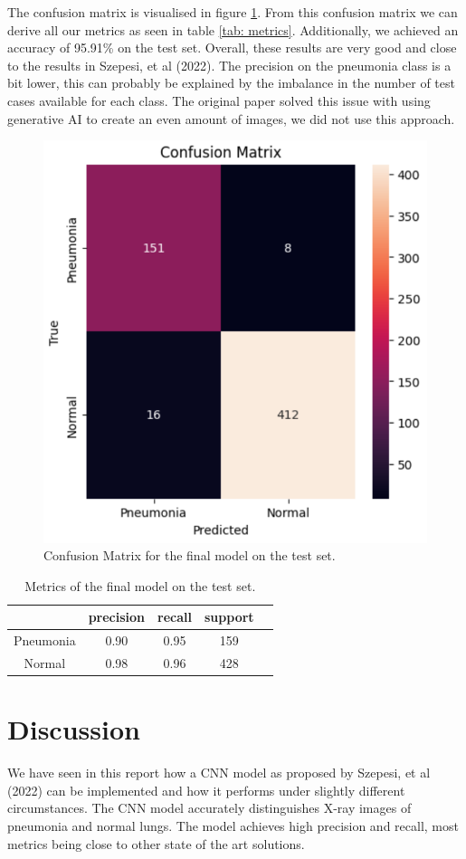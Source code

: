 \documentclass[a4paper]{article}
\begin{document}
The confusion matrix is visualised in figure \ref{fig: confusion matrix}. From
this confusion matrix we can derive all our metrics as seen in table \ref{tab:
metrics}. Additionally, we achieved an accuracy of 95.91\% on the test set.
Overall, these results are very good and close to the results in Szepesi, et al
(2022). The precision on the pneumonia class is a bit lower, this can probably
be explained by the imbalance in the number of test cases available for each
class. The original paper solved this issue with using generative AI to create
an even amount of images, we did not use this approach.

\begin{figure}[h]
	\centering
	\includegraphics[width = .5\textwidth]{imgs/confusion_matrix.png}
	\caption{Confusion Matrix for the final model on the test set.}
	\label{fig: confusion matrix}
\end{figure}

\begin{table}[h]
	\centering
	\begin{tabular}{|c|c|c|c|c|}\hline
	            & precision& recall& support \\\hline
	   Pneumonia&      0.90&   0.95&     159 \\\hline
	      Normal&      0.98&   0.96&     428 \\\hline
	\end{tabular}
	\caption{Metrics of the final model on the test set.}
	\label{tab: metrics}
\end{table}

\section{Discussion}\label{sec: discussion}

We have seen in this report how a CNN model as proposed by Szepesi, et al
(2022) can be implemented and how it performs under slightly different
circumstances. The CNN model accurately distinguishes X-ray images of pneumonia
and normal lungs. The model achieves high precision and recall, most metrics
being close to other state of the art solutions.
\end{document}

